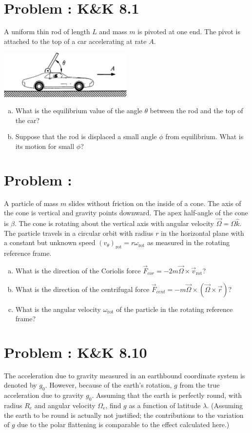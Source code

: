 \documentclass[problems]{esg8012pset}
\begin{document}
\section{Problem \thesection: K\&K 8.1}
  A uniform thin rod of length $L$ and mass $m$ is pivoted at one end. The pivot is attached to the top of a car accelerating at rate $A$.
  \begin{center}\includegraphics[width=0.5\textwidth]{ps11_3}\end{center}
  \begin{enumerate}[(a)]
    \item What is the equilibrium value of the angle $\theta$ between the rod and the top of the car?
    \item Suppose that the rod is displaced a small angle $\phi$ from equilibrium. What is its motion for small $\phi$?
  \end{enumerate}
\section{Problem \thesection: }
  A particle of mass $m$ slides without friction on the inside of a cone. The axis of the cone is vertical and gravity points downward. The apex half-angle of the cone is $\beta$. The cone is rotating about the vertical axis with angular velocity $\vec \Omega = \Omega \hat k$.  The particle travels in a circular orbit with radius $r$ in the horizontal plane with a constant but unknown speed $(v_\theta)_\text{rot} = r\omega_\text{rot}$ as measured in the rotating reference frame.
  \begin{enumerate}[(a)]
    \item What is the direction of the Coriolis force $\vec F_{cor} = -2 m \vec \Omega \times \vec v_\text{rot}$?
    \item What is the direction of the centrifugal force $\vec F_{cent} = -m \vec \Omega \times (\vec \Omega \times \vec r)$?
    \item What is the angular velocity $\omega_\text{rot}$ of the particle in the rotating reference frame?
  \end{enumerate}
\section{Problem \thesection: K\&K 8.10}
  The acceleration due to gravity measured in an earthbound coordinate system is denoted by $g_0$. However, because of the earth's rotation, $g$ from the true acceleration due to gravity $g_0$. Assuming that the earth is perfectly round, with radius $R_e$ and angular velocity $\Omega_e$, find $g$ as a function of latitude $\lambda$. (Assuming the earth to be round is actually not justified; the contributions to the variation of $g$ due to the polar flattening is comparable to the effect calculated here.)
\end{document}

